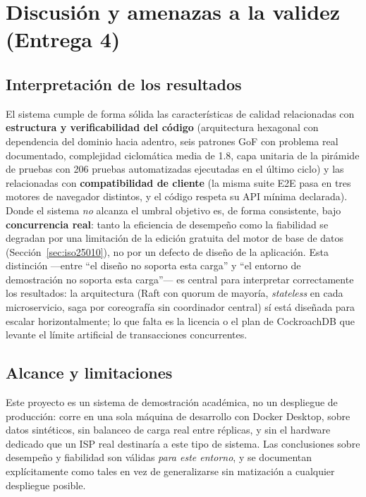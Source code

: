 \section{Discusión y amenazas a la validez (Entrega 4)}
\label{sec:discusion-e4}

\subsection{Interpretación de los resultados}

El sistema cumple de forma sólida las características de calidad relacionadas con
\textbf{estructura y verificabilidad del código} (arquitectura hexagonal con dependencia del
dominio hacia adentro, seis patrones GoF con problema real documentado, complejidad ciclomática
media de 1.8, capa unitaria de la pirámide de pruebas con 206 pruebas automatizadas ejecutadas en
el último ciclo) y las relacionadas con \textbf{compatibilidad de cliente} (la misma suite E2E pasa en tres
motores de navegador distintos, y el código respeta su API mínima declarada). Donde el sistema
\emph{no} alcanza el umbral objetivo es, de forma consistente, bajo \textbf{concurrencia real}:
tanto la eficiencia de desempeño como la fiabilidad se degradan por una limitación de la edición
gratuita del motor de base de datos (Sección~\ref{sec:iso25010}), no por un defecto de diseño de
la aplicación. Esta distinción —entre ``el diseño no soporta esta carga'' y ``el entorno de
demostración no soporta esta carga''— es central para interpretar correctamente los resultados: la
arquitectura (Raft con quorum de mayoría, \emph{stateless} en cada microservicio, saga por
coreografía sin coordinador central) sí está diseñada para escalar horizontalmente; lo que falta
es la licencia o el plan de CockroachDB que levante el límite artificial de transacciones
concurrentes.

\subsection{Alcance y limitaciones}

Este proyecto es un sistema de demostración académica, no un despliegue de producción: corre en
una sola máquina de desarrollo con Docker Desktop, sobre datos sintéticos, sin balanceo de carga
real entre réplicas, y sin el hardware dedicado que un ISP real destinaría a este tipo de
sistema. Las conclusiones sobre desempeño y fiabilidad son válidas \emph{para este entorno}, y se
documentan explícitamente como tales en vez de generalizarse sin matización a cualquier
despliegue posible.

